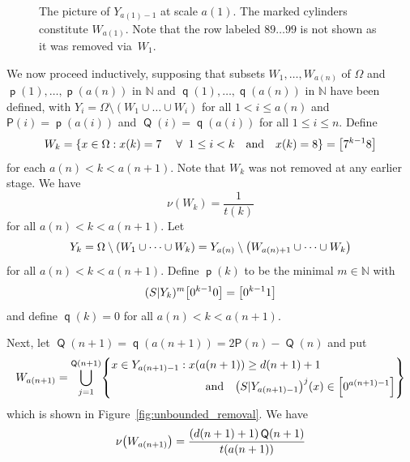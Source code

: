 \documentclass[10pt]{amsart}
\theoremstyle{definition}\newtheorem{defi}[theo]{Definition}\newtheorem{rema}[theo]{Remark}\newtheorem{exam}[theo]{Example}\newtheorem{exem}[theo]{Example}\newtheorem{nota}[theo]{Notation}
\DeclareMathOperator{\p}{\mathsf{p}}
\DeclareMathOperator{\q}{\mathsf{q}}
\DeclareMathOperator{\Q}{\mathsf{Q}}
\newcommand{\N}{\mathbb{N}}
\renewcommand{\P}{\mathsf{P}}
\let\originalleft\left
\let\originalright\right
\renewcommand{\left}{\mathopen{}\mathclose\bgroup\originalleft}
\renewcommand{\right}{\aftergroup\egroup\originalright}
\let\oldforall\forall
\renewcommand*{\forall}{\mathrel{\oldforall}}
\begin{document}
\begin{figure}[t]

\caption{The picture of $Y_{a(1)-1}$ at scale $a(1)$. The marked cylinders constitute $W_{a(1)}$. Note that the row labeled $89\dots 99$ is not shown as it was removed via~$W_1$.}\label{fig:firstBigRemoval}
\end{figure}

\pagebreak
We now proceed inductively, supposing that subsets $W_1,\dots,W_{a(n)}$ of $\Omega$ and $\p(1),\dots,\p(a(n))$ in $\N$ and $\q(1),\dots,\q(a(n))$ in $\N$ have been defined, with $Y_i = \Omega \setminus (W_1 \cup \dots \cup W_i)$ for all $1 < i \le a(n)$ and $\P(i) = \p(a(i))$ and $\Q(i) = \q(a(i))$ for all $1 \le i \le n$. Define
\[
W_k =
\left\{ x \in \Omega : x(k) = 7 \quad\forall\; 1 \le i < k \quad\text{and}\quad x(k) = 8 \right\} = \left[7^{k-1}8\right]
\]
for each $a(n) < k < a(n+1)$. Note that $W_k$ was not removed at any earlier stage. We have
\begin{equation}\label{eqn:meas_bounded_removal}
\nu(W_k) = \frac{1}{t(k)}
\end{equation}
for all $a(n) < k < a(n+1)$. Let
\[
Y_k =
\Omega \setminus (W_1 \cup \dots \cup W_k) = Y_{a(n)} \setminus \left(W_{a(n)+1} \cup \dots \cup W_k\right)
\]
for all $a(n) < k < a(n+1)$. Define $\p(k)$ to be the minimal $m \in \N$ with
\[
(S|Y_k)^m \left[0^{k-1}0\right] = \left[0^{k-1}1\right]
\]
and define $\q(k) = 0$ for all $a(n) < k < a(n+1)$.

Next, let $\Q(n+1) = \q(a(n+1)) = 2 \P(n) - \Q(n)$ and put
\[
W_{a(n+1)} =
\bigcup_{j=1}^{\Q(n+1)}
\left\{
\begin{aligned}
&x \in Y_{a(n+1)-1} : x(a(n+1)) \ge d(n+1) + 1\\
&\mkern150mu\text{and}\quad \left(S|Y_{a(n+1)-1}\right)^j(x) \in \left[0^{a(n+1)-1}\right]
\end{aligned}
\right\}
\]
which is shown in Figure~\ref{fig:unbounded_removal}. We have
\begin{equation}\label{eqn:meas_unbounded_removal}
\nu\left(W_{a(n+1)}\right) = \frac{(d(n+1)+1) \Q(n+1)}{t(a(n+1))}
\end{equation}
\end{document}
